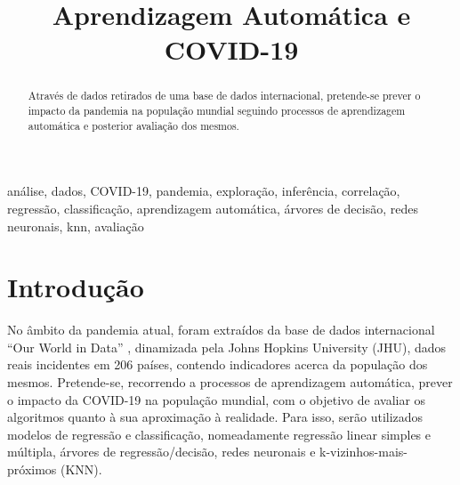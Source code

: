 \documentclass[conference]{IEEEtran}
\begin{document}
\title{Aprendizagem Automática e COVID-19\\
}

\author{
\and
{}
}

\maketitle

\begin{abstract}
Através de dados retirados de uma base de dados internacional, pretende-se prever o impacto da pandemia na população mundial seguindo processos de aprendizagem automática e posterior avaliação dos mesmos.
\end{abstract}

\begin{IEEEkeywords}
análise, dados, COVID-19, pandemia, exploração, inferência, correlação, regressão, classificação, aprendizagem automática, árvores de decisão, redes neuronais, knn, avaliação
\end{IEEEkeywords}

\section{Introdução} %
No âmbito da pandemia atual, foram extraídos da base de dados internacional “Our World in Data” \cite{database}, dinamizada pela Johns Hopkins University (JHU), dados reais incidentes em 206 países, contendo indicadores acerca da população dos mesmos. 
Pretende-se, recorrendo a processos de aprendizagem automática, prever o impacto da COVID-19 na população mundial, com o objetivo de avaliar os algoritmos quanto à sua aproximação à realidade. Para isso, serão utilizados modelos de regressão e classificação, nomeadamente regressão linear simples e múltipla, árvores de regressão/decisão, redes neuronais e k-vizinhos-mais-próximos (KNN).
\end{document}
